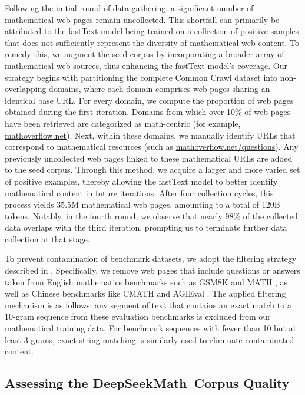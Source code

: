 Following the initial round of data gathering, a significant number of mathematical web pages remain uncollected. This shortfall can primarily be attributed to the fastText model being trained on a collection of positive samples that does not sufficiently represent the diversity of mathematical web content. To remedy this, we augment the seed corpus by incorporating a broader array of mathematical web sources, thus enhancing the fastText model's coverage. Our strategy begins with partitioning the complete Common Crawl dataset into non-overlapping domains, where each domain comprises web pages sharing an identical base URL. For every domain, we compute the proportion of web pages obtained during the first iteration. Domains from which over 10\% of web pages have been retrieved are categorized as math-centric (for example, \url{mathoverflow.net}). Next, within these domains, we manually identify URLs that correspond to mathematical resources (such as \url{mathoverflow.net/questions}). Any previously uncollected web pages linked to these mathematical URLs are added to the seed corpus. Through this method, we acquire a larger and more varied set of positive examples, thereby allowing the fastText model to better identify mathematical content in future iterations. After four collection cycles, this process yields 35.5M mathematical web pages, amounting to a total of 120B tokens. Notably, in the fourth round, we observe that nearly 98\% of the collected data overlaps with the third iteration, prompting us to terminate further data collection at that stage.

To prevent contamination of benchmark datasets, we adopt the filtering strategy described in \cite{deepseek-coder}. Specifically, we remove web pages that include questions or answers taken from English mathematics benchmarks such as GSM8K \citep{gsm8k} and MATH \citep{MATH}, as well as Chinese benchmarks like CMATH \citep{wei2023cmath} and AGIEval \citep{agieval}. The applied filtering mechanism is as follows: any segment of text that contains an exact match to a 10-gram sequence from these evaluation benchmarks is excluded from our mathematical training data. For benchmark sequences with fewer than 10 but at least 3 grams, exact string matching is similarly used to eliminate contaminated content.

\subsection{Assessing the DeepSeekMath~Corpus Quality}

